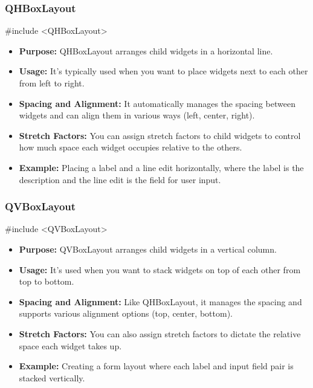 \documentclass{report}
\begin{document}
    \subsubsection{QHBoxLayout} 
    \bigbreak \noindent 
    \begin{cppcode}
    #include <QHBoxLayout>
    \end{cppcode}
    \bigbreak \noindent 
    \begin{itemize}
        \item \textbf{Purpose:} QHBoxLayout arranges child widgets in a horizontal line.
        \item \textbf{Usage:} It's typically used when you want to place widgets next to each other from left to right.
        \item \textbf{Spacing and Alignment:} It automatically manages the spacing between widgets and can align them in various ways (left, center, right).
        \item \textbf{Stretch Factors:} You can assign stretch factors to child widgets to control how much space each widget occupies relative to the others.
        \item \textbf{Example:} Placing a label and a line edit horizontally, where the label is the description and the line edit is the field for user input.
    \end{itemize}

    \pagebreak 
    \subsubsection{QVBoxLayout}
    \bigbreak \noindent 
    \begin{cppcode}
    #include <QVBoxLayout>
    \end{cppcode}
    \bigbreak \noindent 
    \begin{itemize}
        \item \textbf{Purpose:} QVBoxLayout arranges child widgets in a vertical column.
        \item \textbf{Usage:} It's used when you want to stack widgets on top of each other from top to bottom.
        \item \textbf{Spacing and Alignment:} Like QHBoxLayout, it manages the spacing and supports various alignment options (top, center, bottom).
        \item \textbf{Stretch Factors:} You can also assign stretch factors to dictate the relative space each widget takes up.
        \item \textbf{Example:} Creating a form layout where each label and input field pair is stacked vertically.
    \end{itemize}
\end{document}
